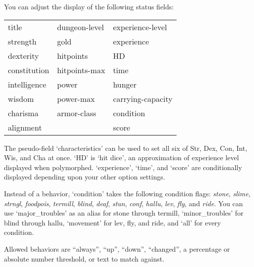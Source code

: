 You can adjust the display of the following status fields:
\begin{center}
\begin{tabular}{lll}
title & dungeon-level & experience-level\\
strength & gold & experience\\
dexterity & hitpoints & HD\\
constitution & hitpoints-max & time\\
intelligence & power & hunger\\
wisdom & power-max & carrying-capacity\\
charisma & armor-class & condition\\
alignment &  & score\\
\end{tabular}
\end{center}
The pseudo-field `characteristics' can be used to set all six
of Str, Dex, Con, Int, Wis, and Cha at once.  `HD' is `hit dice',
an approximation of experience level displayed when polymorphed.
`experience', `time', and `score' are conditionally displayed
depending upon your other option settings.

Instead of a behavior, `condition' takes the following condition flags:
{\it stone}, {\it slime}, {\it strngl}, {\it foodpois}, {\it termill},
{\it blind}, {\it deaf}, {\it stun}, {\it conf}, {\it hallu},
{\it lev}, {\it fly}, and {\it ride}.
You can use `major\_troubles' as an alias
for stone through termill, `minor\_troubles' for blind through hallu,
`movement' for lev, fly, and ride, and `all' for every condition.

Allowed behaviors are ``always'', ``up'', ``down'', ``changed'', a
percentage or absolute number threshold, or text to match against.


